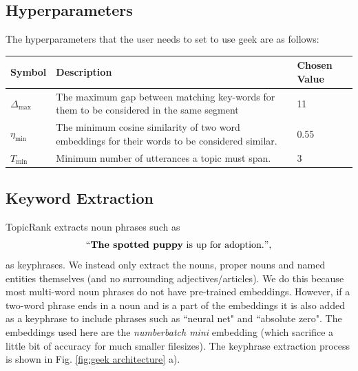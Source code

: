     \subsection{Hyperparameters}
    The hyperparameters that the user needs to set to use \gls{geek} are as follows:

    \begin{table}[h]
        \centering
        \begin{tabularx}{0.9\textwidth}{| t | b | t |}
        \hline
        \textbf{Symbol} & \textbf{Description} & \textbf{Chosen Value} \\ \hline
        $\Delta_{\text{max}}$     & The maximum gap between matching key-words for them to be considered in the same segment & 11                    \\ \hline
        $\eta_{\text{min}}$     & The minimum cosine similarity of two word \glspl{embedding} for their words to be considered similar. & 0.55                        \\ \hline
        $T_{\text{min}}$ & Minimum number of \glspl{utterance} a topic must span. & 3 \\ \hline

        \end{tabularx}
    \end{table}
    

    \subsection{Keyword Extraction}
        TopicRank extracts noun phrases such as
        \begin{equation*}
            ``\textbf{The spotted puppy}\text{ is up for adoption.}",
        \end{equation*}
        as \glspl{keyphrase}. We instead only extract the nouns, proper nouns and named entities themselves (and no surrounding adjectives/articles). We do this because most multi-word noun phrases do not have pre-trained \glspl{embedding}. However, if a two-word phrase ends in a noun and is a part of the \glspl{embedding} it is also added as a \gls{keyphrase} to include phrases such as ``neural net" and ``absolute zero". The \glspl{embedding} used here are the \textit{\gls{numberbatch} mini} \gls{embedding} (which sacrifice a little bit of accuracy for much smaller filesizes). The \gls{keyphrase} extraction process is shown in Fig. \ref{fig:geek architecture} a).

